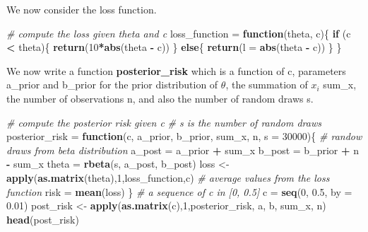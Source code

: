 \documentclass[
]{article}
\newenvironment{Shaded}{\begin{snugshade}}{\end{snugshade}}
\newcommand{\CommentTok}[1]{\textcolor[rgb]{0.56,0.35,0.01}{\textit{#1}}}
\newcommand{\ControlFlowTok}[1]{\textcolor[rgb]{0.13,0.29,0.53}{\textbf{#1}}}
\newcommand{\DataTypeTok}[1]{\textcolor[rgb]{0.13,0.29,0.53}{#1}}
\newcommand{\DecValTok}[1]{\textcolor[rgb]{0.00,0.00,0.81}{#1}}
\newcommand{\FloatTok}[1]{\textcolor[rgb]{0.00,0.00,0.81}{#1}}
\newcommand{\KeywordTok}[1]{\textcolor[rgb]{0.13,0.29,0.53}{\textbf{#1}}}
\newcommand{\NormalTok}[1]{#1}
\newcommand{\OperatorTok}[1]{\textcolor[rgb]{0.81,0.36,0.00}{\textbf{#1}}}
\newcommand{\StringTok}[1]{\textcolor[rgb]{0.31,0.60,0.02}{#1}}
\begin{document}
We now consider the loss function.

\begin{Shaded}
\begin{Highlighting}[]
\CommentTok{# compute the loss given theta and c }
\NormalTok{loss_function =}\StringTok{ }\ControlFlowTok{function}\NormalTok{(theta, c)\{}
  \ControlFlowTok{if}\NormalTok{ (c }\OperatorTok{<}\StringTok{ }\NormalTok{theta)\{}
    \KeywordTok{return}\NormalTok{(}\DecValTok{10}\OperatorTok{*}\KeywordTok{abs}\NormalTok{(theta }\OperatorTok{-}\StringTok{ }\NormalTok{c))}
\NormalTok{  \} }\ControlFlowTok{else}\NormalTok{\{}
    \KeywordTok{return}\NormalTok{(}\DataTypeTok{l =} \KeywordTok{abs}\NormalTok{(theta }\OperatorTok{-}\StringTok{ }\NormalTok{c))}
\NormalTok{  \}}
\NormalTok{\}}
\end{Highlighting}
\end{Shaded}

We now write a function \textbf{posterior\_risk} which is a function of
c, parameters a\_prior and b\_prior for the prior distribution of
\(\theta\), the summation of \(x_i\) sum\_x, the number of observations
n, and also the number of random draws s.

\begin{Shaded}
\begin{Highlighting}[]
\CommentTok{# compute the posterior risk given c }
\CommentTok{# s is the number of random draws }
\NormalTok{posterior_risk =}\StringTok{ }\ControlFlowTok{function}\NormalTok{(c, a_prior, b_prior, sum_x, n, }\DataTypeTok{s =} \DecValTok{30000}\NormalTok{)\{}
  \CommentTok{# randow draws from beta distribution }
\NormalTok{  a_post =}\StringTok{ }\NormalTok{a_prior }\OperatorTok{+}\StringTok{ }\NormalTok{sum_x}
\NormalTok{  b_post =}\StringTok{ }\NormalTok{b_prior }\OperatorTok{+}\StringTok{ }\NormalTok{n }\OperatorTok{-}\StringTok{ }\NormalTok{sum_x}
\NormalTok{  theta =}\StringTok{ }\KeywordTok{rbeta}\NormalTok{(s, a_post, b_post)}
\NormalTok{  loss <-}\StringTok{ }\KeywordTok{apply}\NormalTok{(}\KeywordTok{as.matrix}\NormalTok{(theta),}\DecValTok{1}\NormalTok{,loss_function,c)}
  \CommentTok{# average values from the loss function}
\NormalTok{  risk =}\StringTok{ }\KeywordTok{mean}\NormalTok{(loss)}
\NormalTok{\}}
\CommentTok{# a sequence of c in [0, 0.5]}
\NormalTok{c =}\StringTok{ }\KeywordTok{seq}\NormalTok{(}\DecValTok{0}\NormalTok{, }\FloatTok{0.5}\NormalTok{, }\DataTypeTok{by =} \FloatTok{0.01}\NormalTok{)}
\NormalTok{post_risk <-}\StringTok{ }\KeywordTok{apply}\NormalTok{(}\KeywordTok{as.matrix}\NormalTok{(c),}\DecValTok{1}\NormalTok{,posterior_risk, a, b, sum_x, n)}
\KeywordTok{head}\NormalTok{(post_risk)}
\end{Highlighting}
\end{Shaded}
\end{document}
